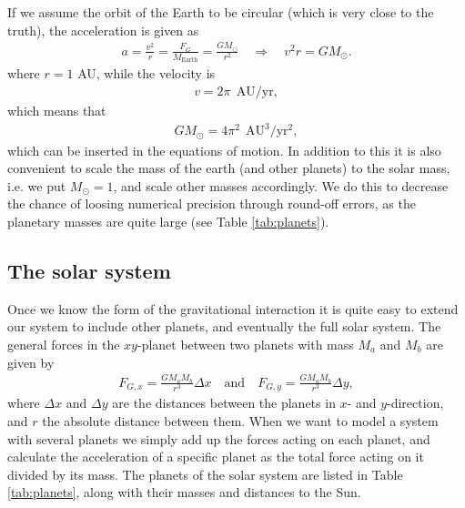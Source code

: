 \documentclass[12pt, a4paper]{article}
\begin{document}
If we assume the orbit 
of the Earth to be circular (which is very close to the truth), the acceleration is given as 
\begin{align*}
a = \frac{v^2}{r} = \frac{F_G}{M_{\text{Earth}}} = \frac{GM_{\odot}}{r^2} \quad \Rightarrow \quad 
v^2 r = GM_{\odot}. 
\end{align*}  
where $r = 1$ AU, while the velocity is 
\begin{align*}
v = 2\pi \:\: \text{AU/yr},   
\end{align*}
which means that 
\begin{align*}
GM_{\odot} = 4\pi^2 \:\: \text{AU}^3/\text{yr}^2,  
\end{align*}
which can be inserted in the equations of motion. In addition to this it is also 
convenient to scale the mass of the earth (and other planets) to the solar mass, i.e. we put 
$M_{\odot} = 1$, and scale other masses accordingly. We do this to decrease the chance of loosing 
numerical precision through round-off errors, as the planetary masses are quite large (see Table  
\ref{tab:planets}). 

\subsection*{The solar system}

Once we know the form of the gravitational interaction it is quite easy to extend our system to include 
other planets, and eventually the full solar system. The general forces in the $xy$-planet  
between two planets with mass $M_a$ and $M_b$ are given by 
\begin{align*}
F_{G,x} = \frac{GM_aM_b}{r^3}\Delta x \quad \text{and} \quad F_{G,y} = \frac{GM_aM_b}{r^3}\Delta y, 
\end{align*}  
where $\Delta x$ and $\Delta y$ are the distances between the planets in $x$- and $y$-direction, and 
$r$ the absolute distance between them. When we want to model a system with several planets we simply 
add up the forces acting on each planet, and calculate the acceleration of a specific planet as 
the total force acting on it divided by its mass. The planets of the solar system are listed in Table 
\ref{tab:planets}, along with their masses and distances to the Sun.   
\end{document}
